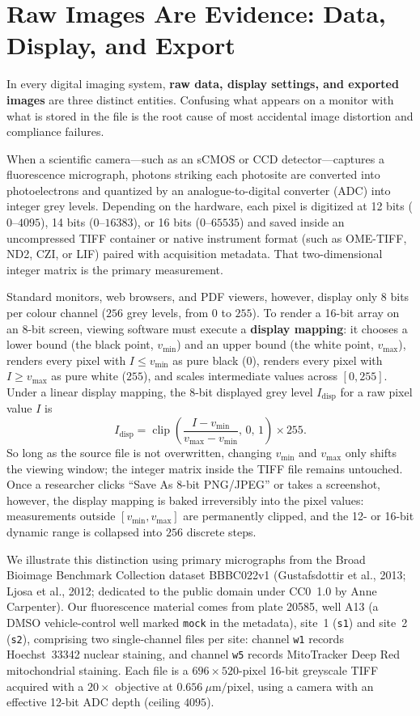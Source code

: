 \section{Raw Images Are Evidence: Data, Display, and Export}

In every digital imaging system, \textbf{raw data, display settings, and exported images} are three distinct entities. Confusing what appears on a monitor with what is stored in the file is the root cause of most accidental image distortion and compliance failures.

When a scientific camera---such as an sCMOS or CCD detector---captures a fluorescence micrograph, photons striking each photosite are converted into photoelectrons and quantized by an analogue-to-digital converter (ADC) into integer grey levels. Depending on the hardware, each pixel is digitized at 12 bits ($0\text{--}4095$), 14 bits ($0\text{--}16383$), or 16 bits ($0\text{--}65535$) and saved inside an uncompressed TIFF container or native instrument format (such as OME-TIFF, ND2, CZI, or LIF) paired with acquisition metadata. That two-dimensional integer matrix is the primary measurement.

Standard monitors, web browsers, and PDF viewers, however, display only 8 bits per colour channel ($256$ grey levels, from $0$ to $255$). To render a 16-bit array on an 8-bit screen, viewing software must execute a \textbf{display mapping}: it chooses a lower bound (the black point, $v_{\min}$) and an upper bound (the white point, $v_{\max}$), renders every pixel with $I \le v_{\min}$ as pure black ($0$), renders every pixel with $I \ge v_{\max}$ as pure white ($255$), and scales intermediate values across $[0, 255]$. Under a linear display mapping, the 8-bit displayed grey level $I_{\text{disp}}$ for a raw pixel value $I$ is
\[
I_{\text{disp}} = \operatorname{clip}\!\left(\frac{I - v_{\min}}{v_{\max} - v_{\min}},\, 0,\, 1\right) \times 255.
\]
So long as the source file is not overwritten, changing $v_{\min}$ and $v_{\max}$ only shifts the viewing window; the integer matrix inside the TIFF file remains untouched. Once a researcher clicks ``Save As 8-bit PNG/JPEG'' or takes a screenshot, however, the display mapping is baked irreversibly into the pixel values: measurements outside $[v_{\min}, v_{\max}]$ are permanently clipped, and the 12- or 16-bit dynamic range is collapsed into $256$ discrete steps.

We illustrate this distinction using primary micrographs from the Broad Bioimage Benchmark Collection dataset BBBC022v1 (Gustafsdottir et al., 2013; Ljosa et al., 2012; dedicated to the public domain under CC0~1.0 by Anne Carpenter). Our fluorescence material comes from plate 20585, well A13 (a DMSO vehicle-control well marked \texttt{mock} in the metadata), site~1 (\texttt{s1}) and site~2 (\texttt{s2}), comprising two single-channel files per site: channel \texttt{w1} records Hoechst~33342 nuclear staining, and channel \texttt{w5} records MitoTracker Deep Red mitochondrial staining. Each file is a $696 \times 520$-pixel 16-bit greyscale TIFF acquired with a $20\times$ objective at $0.656\ \mu\text{m/pixel}$, using a camera with an effective 12-bit ADC depth (ceiling $4095$).

